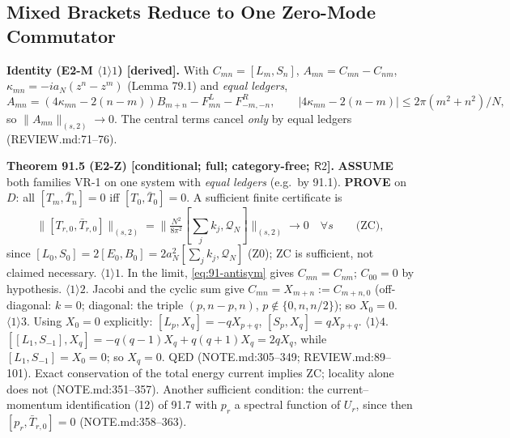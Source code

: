\subsection{Mixed Brackets Reduce to One Zero-Mode Commutator}

\textbf{Identity (E2-M \(\langle1\rangle1\)) [derived].}  With \(C_{mn}=[L_m,S_n]\), \(A_{mn}=C_{mn}-C_{nm}\),
\(\kappa_{mn}=-ia_N(z^n-z^m)\) (Lemma 79.1) and \emph{equal ledgers},
\begin{equation}\label{eq:91-antisym}
  A_{mn}=(4\kappa_{mn}-2(n-m))B_{m+n}-F^L_{mn}-F^R_{-m,-n},\qquad |4\kappa_{mn}-2(n-m)|\le2\pi(m^2+n^2)/N,
\end{equation}
so \(\|A_{mn}\|_{(s,2)}\to0\).  The central terms cancel \emph{only} by equal ledgers (REVIEW.md:71--76).

\textbf{Theorem 91.5 (E2-Z) [conditional; full; category-free; \(\mathsf R2\)].}  \textbf{ASSUME} both families VR-1
on one system with \emph{equal ledgers} (e.g.\ by 91.1).  \textbf{PROVE} on \(D\): all \([T_m,\bar T_n]=0\) iff
\([T_0,\bar T_0]=0\).  A sufficient finite certificate is
\begin{equation}\label{eq:91-ZC}
  \textstyle\|[T_{r,0},\bar T_{r,0}]\|_{(s,2)}=\big\|\tfrac{N^2}{8\pi^2}[\sum_jk_j,\mathcal Q_N]\big\|_{(s,2)}\to0\quad\forall s\qquad\text{(ZC)},
\end{equation}
since \([L_0,S_0]=2[E_0,B_0]=2a_N^2[\sum_jk_j,\mathcal Q_N]\) (Z0); ZC is sufficient, not claimed necessary.
\(\langle1\rangle1\). In the limit, \eqref{eq:91-antisym} gives \(C_{mn}=C_{nm}\); \(C_{00}=0\) by hypothesis.
\(\langle1\rangle2\). Jacobi and the cyclic sum give \(C_{mn}=X_{m+n}:=C_{m+n,0}\) (off-diagonal: \(k=0\); diagonal: the triple
\((p,n-p,n)\), \(p\notin\{0,n,n/2\}\)); so \(X_0=0\).
\(\langle1\rangle3\). Using \(X_0=0\) explicitly: \([L_p,X_q]=-qX_{p+q}\), \([S_p,X_q]=qX_{p+q}\).
\(\langle1\rangle4\). \([[L_1,S_{-1}],X_q]=-q(q-1)X_q+q(q+1)X_q=2qX_q\), while \([L_1,S_{-1}]=X_0=0\); so \(X_q=0\).
QED (NOTE.md:305--349; REVIEW.md:89--101).  Exact conservation of the total energy current implies ZC; locality
alone does not (NOTE.md:351--357).  Another sufficient condition: the current--momentum identification (12) of 91.7
with \(p_r\) a spectral function of \(U_r\), since then \([p_r,\bar T_{r,0}]=0\) (NOTE.md:358--363).

